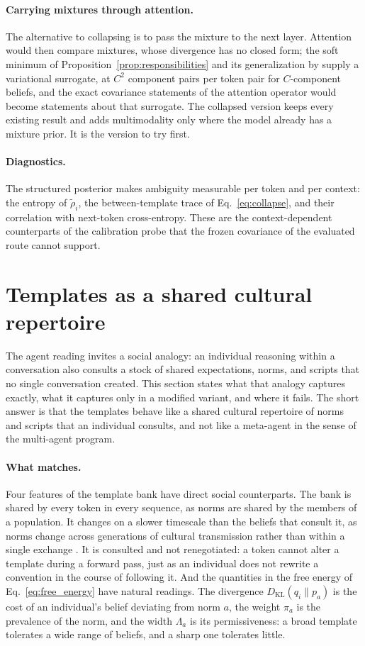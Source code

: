 \documentclass[11pt]{article}
\theoremstyle{definition}
\theoremstyle{remark}
\newcommand{\KL}{D_{\mathrm{KL}}}
\begin{document}
\paragraph{Carrying mixtures through attention.}
The alternative to collapsing is to pass the mixture to the next layer. Attention would then compare mixtures, whose divergence has no closed form; the soft minimum of Proposition~\ref{prop:responsibilities} and its generalization by \citet{hershey2007} supply a variational surrogate, at $C^2$ component pairs per token pair for $C$-component beliefs, and the exact covariance statements of the attention operator would become statements about that surrogate. The collapsed version keeps every existing result and adds multimodality only where the model already has a mixture prior. It is the version to try first.

\paragraph{Diagnostics.}
The structured posterior makes ambiguity measurable per token and per context: the entropy of $\tilde\rho_i$, the between-template trace of Eq.~\eqref{eq:collapse}, and their correlation with next-token cross-entropy. These are the context-dependent counterparts of the calibration probe that the frozen covariance of the evaluated route cannot support.

\section{Templates as a shared cultural repertoire}
\label{sec:social}

The agent reading invites a social analogy: an individual reasoning within a conversation also consults a stock of shared expectations, norms, and scripts that no single conversation created. This section states what that analogy captures exactly, what it captures only in a modified variant, and where it fails. The short answer is that the templates behave like a shared cultural repertoire of norms and scripts that an individual consults, and not like a meta-agent in the sense of the multi-agent program.

\paragraph{What matches.}
Four features of the template bank have direct social counterparts. The bank is shared by every token in every sequence, as norms are shared by the members of a population. It changes on a slower timescale than the beliefs that consult it, as norms change across generations of cultural transmission rather than within a single exchange \citep{boyd1985}. It is consulted and not renegotiated: a token cannot alter a template during a forward pass, just as an individual does not rewrite a convention in the course of following it. And the quantities in the free energy of Eq.~\eqref{eq:free_energy} have natural readings. The divergence $\KL(q_i\|p_a)$ is the cost of an individual's belief deviating from norm $a$, the weight $\pi_a$ is the prevalence of the norm, and the width $\Lambda_a$ is its permissiveness: a broad template tolerates a wide range of beliefs, and a sharp one tolerates little.
\end{document}
